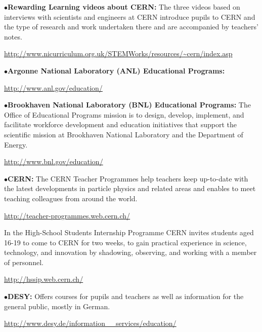 \medskip

\item{$\bullet$}{\bf Rewarding Learning videos about CERN:}
The three videos based on interviews with scientists and engineers at CERN introduce pupils to CERN and the type of research and work undertaken there and are accompanied by teachers' notes.
	\item{}\qquad\url{http://www.nicurriculum.org.uk/STEMWorks/resources/~cern/index.asp}


\medskip
\medskip


\smallskip

\item{$\bullet$}{\bf Argonne National Laboratory (ANL) Educational Programs:}
	\item{}\qquad\url{http://www.anl.gov/education/}

\smallskip

\item{$\bullet$}{\bf Brookhaven National Laboratory (BNL) Educational Programs:}
The Office of Educational Programs mission is to design, develop, implement, and facilitate workforce development and education initiatives that support the scientific mission at Brookhaven National Laboratory and the Department of Energy.
	\item{}\qquad\url{http://www.bnl.gov/education/}

\smallskip

\item{$\bullet$}{\bf CERN:}
The CERN Teacher Programmes help teachers keep up-to-date with the latest developments in particle physics and related areas and enables to meet teaching colleagues from around the world.
	\item{}\qquad\url{http://teacher-programmes.web.cern.ch/}

In the High-School Students Internship Programme CERN invites students aged 16-19 to come to CERN for two weeks, to gain practical experience in science, technology, and innovation by shadowing, observing, and working with a member of personnel.
	\item{}\qquad\url{http://hssip.web.cern.ch/}

\smallskip

\item{$\bullet$}{\bf DESY:}
Offers courses for pupils and teachers as well as information for the general public, mostly in German.
	\item{}\qquad\url{http://www.desy.de/information__services/education/}

